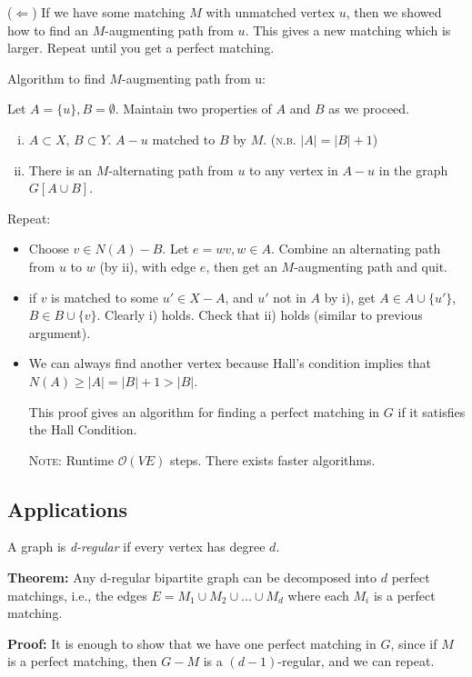\documentclass[11pt, letterpaper, oneside]{article}
\newcommand{\bigO}{\ensuremath{\mathcal{O}}}%
\begin{document}
($\Leftarrow$) If we have some matching $M$ with unmatched vertex $u$, then we showed how to find an $M$-augmenting path from $u$. This gives a new matching which is larger. Repeat until you get a perfect matching.

Algorithm to find $M$-augmenting path from u:

Let $A = \{u\}, B=\emptyset$. Maintain two properties of $A$ and $B$ as we proceed.

\begin{enumerate}[i)]
	\item $A \subset X$, $B \subset Y$. $A-u$ matched to $B$ by $M$. (\textsc{n.b.} $|A|=|B|+1$)
	\item There is an $M$-alternating path from $u$ to any vertex in $A-u$ in the graph $G[A \cup B]$. 
\end{enumerate}

Repeat:
\begin{itemize}
	\item Choose $v \in N(A)-B$. Let $e=wv, w \in A$. Combine an alternating path from $u$ to $w$ (by ii), with edge $e$, then get an $M$-augmenting path and quit.
	\item if $v$ is matched to some $u' \in X-A$, and $u'$ not in $A$ by i), get $A \in A \cup \{u'\}$, $B \in B \cup \{v\}$. Clearly i) holds. Check that ii) holds (similar to previous argument).
	\item We can always find another vertex because Hall's condition implies that $N(A) \geq |A| = |B| + 1 > |B|$.
	
This proof gives an algorithm for finding a perfect matching in $G$ if it satisfies the Hall Condition.

\textsc{Note:} Runtime $\bigO(VE)$ steps. There exists faster algorithms.
\end{itemize}

\subsection*{Applications}

A graph is \textit{d-regular} if every vertex has degree $d$.

\textbf{Theorem:} Any d-regular bipartite graph can be decomposed into $d$ perfect matchings, i.e., the edges $E = M_1 \cup M_2 \cup ... \cup M_d$ where each $M_i$ is a perfect matching.

\textbf{Proof:} It is enough to show that we have one perfect matching in $G$, since if $M$ is a perfect matching, then $G-M$ is a $(d-1)$-regular, and we can repeat.
\end{document}
